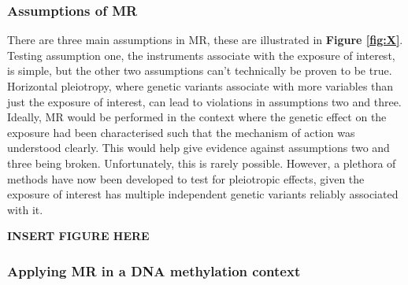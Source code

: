 \documentclass[11pt,twoside]{bristolthesis}
\begin{document}
\hypertarget{assumptions-of-mr}{%
\subsubsection{Assumptions of MR}\label{assumptions-of-mr}}

There are three main assumptions in MR, these are illustrated in \textbf{Figure \ref{fig:X}}. Testing assumption one, the instruments associate with the exposure of interest, is simple, but the other two assumptions can't technically be proven to be true. Horizontal pleiotropy, where genetic variants associate with more variables than just the exposure of interest, can lead to violations in assumptions two and three. Ideally, MR would be performed in the context where the genetic effect on the exposure had been characterised such that the mechanism of action was understood clearly. This would help give evidence against assumptions two and three being broken. Unfortunately, this is rarely possible. However, a plethora of methods have now been developed to test for pleiotropic effects, given the exposure of interest has multiple independent genetic variants reliably associated with it.

\textbf{INSERT FIGURE HERE}

\hypertarget{applying-mr-in-a-dna-methylation-context}{%
\subsubsection{Applying MR in a DNA methylation context}\label{applying-mr-in-a-dna-methylation-context}}
\end{document}
